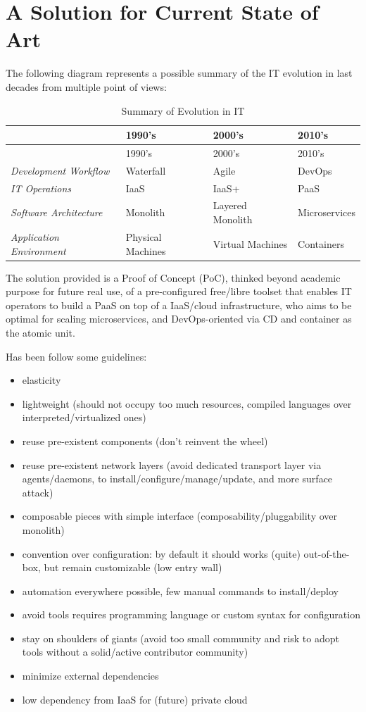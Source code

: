 \section{A Solution for Current State of
Art}\label{a-solution-for-current-state-of-art}

The following diagram represents a possible summary of the IT evolution
in last decades from multiple point of views:

\begin{longtable}[c]{@{}llll@{}}
\caption{Summary of Evolution in IT}\tabularnewline
\toprule
& 1990's & 2000's & 2010's\tabularnewline
\midrule
\endfirsthead
\toprule
& 1990's & 2000's & 2010's\tabularnewline
\midrule
\endhead
\emph{Development Workflow} & Waterfall & Agile & DevOps\tabularnewline
\emph{IT Operations} & IaaS & IaaS+ & PaaS\tabularnewline
\emph{Software Architecture} & Monolith & Layered Monolith &
Microservices\tabularnewline
\emph{Application Environment} & Physical Machines & Virtual Machines &
Containers\tabularnewline
\bottomrule
\end{longtable}

The solution provided is a Proof of Concept (PoC), thinked beyond
academic purpose for future real use, of a pre-configured free/libre
toolset that enables IT operators to build a PaaS on top of a IaaS/cloud
infrastructure, who aims to be optimal for scaling microservices, and
DevOps-oriented via CD and container as the atomic unit.

Has been follow some guidelines:

\begin{itemize}
\itemsep1pt\parskip0pt
\item
  elasticity
\item
  lightweight (should not occupy too much resources, compiled languages
  over interpreted/virtualized ones)
\item
  reuse pre-existent components (don't reinvent the wheel)
\item
  reuse pre-existent network layers (avoid dedicated transport layer via
  agents/daemons, to install/configure/manage/update, and more surface
  attack)
\item
  composable pieces with simple interface (composability/pluggability
  over monolith)
\item
  convention over configuration: by default it should works (quite)
  out-of-the-box, but remain customizable (low entry wall)
\item
  automation everywhere possible, few manual commands to install/deploy
\item
  avoid tools requires programming language or custom syntax for
  configuration
\item
  stay on shoulders of giants (avoid too small community and risk to
  adopt tools without a solid/active contributor community)
\item
  minimize external dependencies
\item
  low dependency from IaaS for (future) private cloud
\end{itemize}

